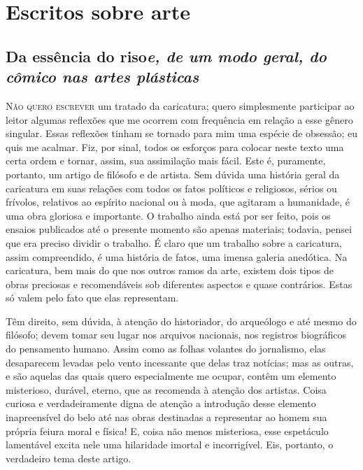 \part{Escritos sobre arte}

\chapter*{Da essência do riso\break \emph{\large{e, de um modo geral, do cômico nas artes plásticas}}}



\sectionitem

\noindent\textsc{Não quero escrever} um tratado da caricatura; quero simplesmente
participar ao leitor algumas reflexões que me ocorrem com frequência em
relação a esse gênero singular. Essas reflexões tinham se tornado para
mim uma espécie de obsessão; eu quis me acalmar. Fiz, por sinal, todos
os esforços para colocar neste texto uma certa ordem e tornar, assim,
sua assimilação mais fácil. Este é, puramente, portanto, um artigo de
filósofo e de artista. Sem dúvida uma história geral da caricatura em
suas relações com todos os fatos políticos e religiosos, sérios ou
frívolos, relativos ao espírito nacional ou à moda, que agitaram a
humanidade, é uma obra gloriosa e importante. O trabalho ainda está por
ser feito, pois os ensaios publicados até o presente momento são apenas
materiais; todavia, pensei que era preciso dividir o trabalho. É claro
que um trabalho sobre a caricatura, assim compreendido, é uma história
de fatos, uma imensa galeria anedótica. Na caricatura, bem mais do que
nos outros ramos da arte, existem dois tipos de obras preciosas e
recomendáveis sob diferentes aspectos e quase contrários. Estas só
valem pelo fato que elas representam.

Têm direito, sem dúvida, à atenção do historiador, do arqueólogo e até
mesmo do filósofo; devem tomar seu lugar nos arquivos nacionais, nos
registros biográficos do pensamento humano. Assim como as folhas
volantes do jornalismo, elas desaparecem levadas pelo vento incessante
que delas traz notícias; mas as outras, e são aquelas das quais quero
especialmente me ocupar, contêm um elemento misterioso, durável,
eterno, que as recomenda à atenção dos artistas. Coisa curiosa e
verdadeiramente digna de atenção a introdução desse elemento
inapreensível do belo até nas obras destinadas a representar ao homem
sua própria feiura moral e física! E, coisa não menos misteriosa, esse
espetáculo lamentável excita nele uma hilaridade imortal e
incorrigível. Eis, portanto, o verdadeiro tema deste artigo.

